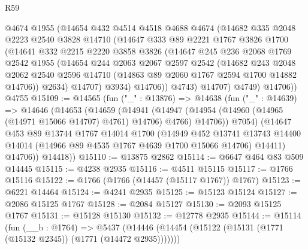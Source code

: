 \begin{lexlean}{R59}
\begin{coremodule}
            @4674
            @1955
            (@14654
              @432
              @4514
              @4518
              @4688
              @4674
              (@14682
                @335
                @2048
                @2223
                @2540
                @3828
                @14710
                (@14647
                  @333
                  @89
                  @2221
                  @1767
                  @3826
                  @1700
                  (@14641
                    @332
                    @2215
                    @2220
                    @3858
                    @3826
                    (@14647
                      @245
                      @236
                      @2068
                      @1769
                      @2542
                      @1955
                      (@14654
                        @244
                        @2063
                        @2067
                        @2597
                        @2542
                        (@14682
                          @243
                          @2048
                          @2062
                          @2540
                          @2596
                          @14710
                          (@14863 @89 @2060 @1767 @2594 @1700 @14882 @14706))
                        @2634)
                      @14707)
                    @3934)
                  @14706))
              @4743)
            @14707)
          @4749)
        @14706))
    @4755
@15109 := @14565
    (fun ("_" : @13876) =>
    @14638
      (fun ("_" : @14639) =>
      @14646
        (@14653
          (@14659
            (@14941
              (@14947 (@14954 (@14960 (@14965 (@14971 @15066 @14707) @4761) @14706) @4766) @14706))
            @7054)
          (@14647
            @453
            @89
            @13744
            @1767
            @14014
            @1700
            (@14949
              @452
              @13741
              @13743
              @14400
              @14014
              (@14966 @89 @4535 @1767 @4639 @1700 @15066 @14706)
              @14411)
            @14706))
        @14418))
@15110 := @13875 @2862
@15114 := @6647 @464 @83 @509 @14445
@15115 := @4238 @2935
@15116 := @4511 @15115
@15117 := @1766 @15116
@15122 := @1766 (@1766 (@14457 (@15117 @1767)) @1767)
@15123 := @6221 @14464
@15124 := @4241 @2935
@15125 := @15123 @15124
@15127 := @2086 @15125 @1767
@15128 := @2084 @15127
@15130 := @2093 @15125 @1767
@15131 := @15128 @15130
@15132 := @12778 @2935
@15144 := @15114
    (fun (__b : @1764) =>
    @5437 (@14446 (@14454 (@15122 (@15131 (@1771 (@15132 @2345)) (@1771 (@14472 @2935)))))))

\end{coremodule}
\end{lexlean}

